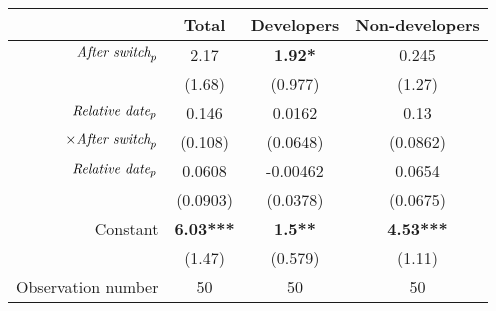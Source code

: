 \begin{tabular}{|r|c|c|c|}
\hline
&  Total & Developers & Non-developers \\
\hline
$\mbox{\emph{After switch}}_p$ & 2.17 & \textbf{1.92*} & 0.245 \\
 & (1.68) & (0.977) & (1.27) \\
\hline
$\mbox{\emph{Relative date}}_p$ & 0.146 & 0.0162 & 0.13 \\
$\times \mbox{\emph{After switch}}_p$ & (0.108) & (0.0648) & (0.0862) \\
\hline
$\mbox{\emph{Relative date}}_p$ & 0.0608 & -0.00462 & 0.0654 \\
 & (0.0903) & (0.0378) & (0.0675) \\
\hline
Constant & \textbf{6.03***} & \textbf{1.5**} & \textbf{4.53***} \\
 & (1.47) & (0.579) & (1.11) \\
\hline
Observation number & 50 & 50 & 50 \\
\hline
\end{tabular}